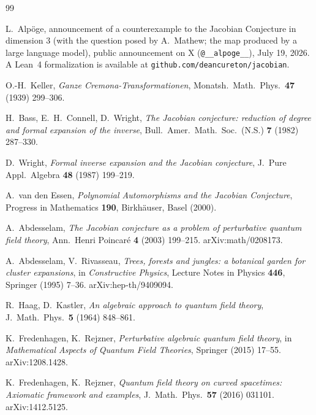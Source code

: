\documentclass[11pt]{article}
\theoremstyle{definition}
\theoremstyle{remark}
\begin{document}
\begin{thebibliography}{99}

L.~Alp\"oge,
announcement of a counterexample to the Jacobian Conjecture in
dimension $3$ (with the question posed by A.~Mathew; the map produced
by a large language model), public announcement on X
(\texttt{@\_\_alpoge\_\_}), July 19, 2026.
A Lean~4 formalization is available at
\texttt{github.com/deancureton/jacobian}.

O.-H.~Keller,
\emph{Ganze Cremona-Transformationen},
Monatsh.\ Math.\ Phys.\ \textbf{47} (1939) 299--306.

H.~Bass, E.~H.~Connell, D.~Wright,
\emph{The Jacobian conjecture: reduction of degree and formal expansion
of the inverse},
Bull.\ Amer.\ Math.\ Soc.\ (N.S.) \textbf{7} (1982) 287--330.

D.~Wright,
\emph{Formal inverse expansion and the Jacobian conjecture},
J.\ Pure Appl.\ Algebra \textbf{48} (1987) 199--219.

A.~van den Essen,
\emph{Polynomial Automorphisms and the Jacobian Conjecture},
Progress in Mathematics \textbf{190}, Birkh\"auser, Basel (2000).

A.~Abdesselam,
\emph{The Jacobian conjecture as a problem of perturbative quantum
field theory},
Ann.\ Henri Poincar\'e \textbf{4} (2003) 199--215.
arXiv:math/0208173.

A.~Abdesselam, V.~Rivasseau,
\emph{Trees, forests and jungles: a botanical garden for cluster
expansions},
in \emph{Constructive Physics}, Lecture Notes in Physics \textbf{446},
Springer (1995) 7--36. arXiv:hep-th/9409094.

R.~Haag, D.~Kastler,
\emph{An algebraic approach to quantum field theory},
J.\ Math.\ Phys.\ \textbf{5} (1964) 848--861.

K.~Fredenhagen, K.~Rejzner,
\emph{Perturbative algebraic quantum field theory},
in \emph{Mathematical Aspects of Quantum Field Theories},
Springer (2015) 17--55. arXiv:1208.1428.

K.~Fredenhagen, K.~Rejzner,
\emph{Quantum field theory on curved spacetimes: Axiomatic framework
and examples},
J.\ Math.\ Phys.\ \textbf{57} (2016) 031101. arXiv:1412.5125.


\end{thebibliography}
\end{document}
